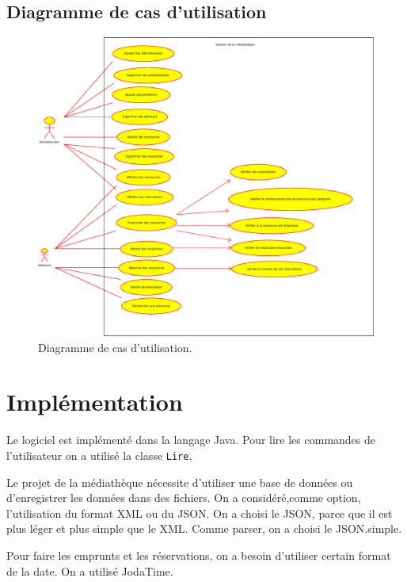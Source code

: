 \documentclass[10pt, a4paper]{article}
\begin{document}
    		 \subsection{Diagramme de cas d'utilisation}
    		 
    		 \begin{figure}[h]
			\begin{center}
				\includegraphics[width=1\textwidth]{graphics/usecasediagram.eps}
				\caption{Diagramme de cas d'utilisation.}
			\end{center}
		\end{figure}
	
	\section{Implémentation}
	Le logiciel est implémenté dans la langage Java. Pour lire les commandes de l'utilisateur on a utilisé 
	la classe \texttt{Lire}.
	
	Le projet de la médiathèque nécessite d'utiliser une base de données ou d'enregistrer les données dans des
	fichiers.
	On a considéré,comme option, l'utilisation du format XML ou du JSON. On a choisi le JSON, parce que il est plus léger et plus
	simple que le XML. Comme parser, on a choisi le JSON.simple.
	
	Pour faire les emprunts et les réservations, on a besoin d'utiliser certain format de la date. On a utilisé 
	JodaTime.
	
\end{document}
